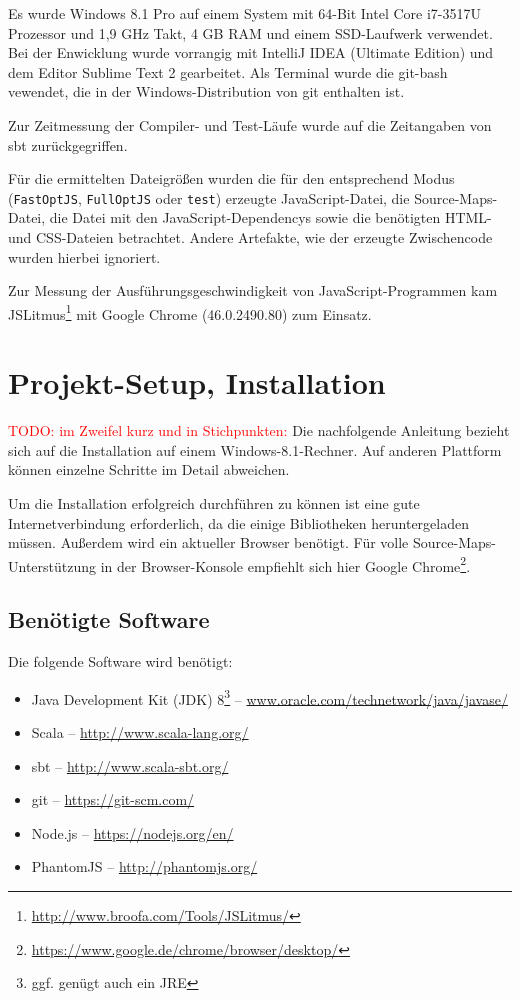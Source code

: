 \documentclass[a4paper, 12pt, hidelinks, listof=totoc, listoftables=totoc, bibliography=totoc]{scrreprt}
\newcommand{\code}[1]{\lstinline[language=Scala, style=inline]|#1|}
\newcommand{\TODO}[1]{\textcolor{red}{#1}\newline}
\begin{document}
Es wurde Windows 8.1 Pro auf einem System mit 64-Bit Intel Core i7-3517U Prozessor und 1,9 GHz Takt, 4 GB RAM und einem SSD-Laufwerk verwendet. Bei der Enwicklung wurde vorrangig mit IntelliJ IDEA (Ultimate Edition) und dem Editor Sublime Text 2 gearbeitet. Als Terminal wurde die git-bash vewendet, die in der Windows-Distribution von git enthalten ist.

Zur Zeitmessung der Compiler- und Test-Läufe wurde auf die Zeitangaben von sbt zurückgegriffen.

Für die ermittelten Dateigrößen wurden die für den entsprechend Modus (\code{FastOptJS}, \code{FullOptJS} oder \code{test}) erzeugte JavaScript-Datei, die Source-Maps-Datei, die Datei mit den JavaScript-Dependencys sowie die benötigten HTML- und CSS-Dateien betrachtet. Andere Artefakte, wie der erzeugte Zwischencode wurden hierbei ignoriert.

Zur Messung der Ausführungsgeschwindigkeit von JavaScript-Programmen kam JSLitmus\footnote{\url{http://www.broofa.com/Tools/JSLitmus/}} mit Google Chrome (46.0.2490.80) zum Einsatz.



\chapter{Projekt-Setup, Installation}\label{chap:setup}


\TODO{TODO: im Zweifel kurz und in Stichpunkten:}
Die nachfolgende Anleitung bezieht sich auf die Installation auf einem Windows-8.1-Rechner. Auf anderen Plattform können einzelne Schritte im Detail abweichen.

Um die Installation erfolgreich durchführen zu können ist eine gute Internetverbindung erforderlich, da die einige Bibliotheken heruntergeladen müssen. Außerdem wird ein aktueller Browser benötigt. Für volle Source-Maps-Unterstützung in der Browser-Konsole empfiehlt sich hier Google Chrome\footnote{\url{https://www.google.de/chrome/browser/desktop/}}.

\section{Benötigte Software}

Die folgende Software wird benötigt:

\begin{itemize}
	\item Java Development Kit (JDK) 8\footnote{ggf. genügt auch ein JRE}  --  \url{www.oracle.com/technetwork/java/javase/}
	\item Scala  --  \url{http://www.scala-lang.org/}
	\item sbt  --  \url{http://www.scala-sbt.org/}
	\item git  --  \url{https://git-scm.com/}
	\item Node.js  --  \url{https://nodejs.org/en/}
	\item PhantomJS  --  \url{http://phantomjs.org/}
\end{itemize}
\end{document}
